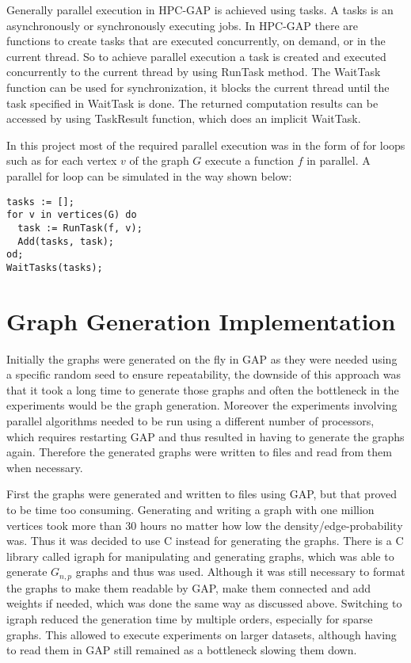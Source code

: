 \documentclass{report}
\theoremstyle{plain}
\theoremstyle{definition}
\theoremstyle{remark}
\begin{document}
Generally parallel execution in HPC-GAP is achieved using tasks. A tasks is an asynchronously or synchronously executing jobs. In HPC-GAP there are functions to create tasks that are executed concurrently, on demand, or in the current thread. So to achieve parallel execution a task is created and executed concurrently to the current thread by using RunTask method. The WaitTask function can be used for synchronization, it blocks the current thread until the task specified in WaitTask is done. The returned computation results can be accessed by using TaskResult function, which does an implicit WaitTask.

In this project most of the required parallel execution was in the form of for loops such as for each vertex $v$ of the graph $G$ execute a function $f$ in parallel. A parallel for loop can be simulated in the way shown below:

\begin{lstlisting}
tasks := [];
for v in vertices(G) do
  task := RunTask(f, v);
  Add(tasks, task);
od;
WaitTasks(tasks);
\end{lstlisting}

\section{Graph Generation Implementation}

Initially the graphs were generated on the fly in GAP as they were needed  using a specific random seed to ensure repeatability, the downside of this approach was that it took a long time to generate those graphs and often the bottleneck in the experiments would be the graph generation. Moreover the experiments involving parallel algorithms needed to be run using a different number of processors, which requires restarting GAP and thus resulted in having to generate the graphs again. Therefore the generated graphs were written to files and read from them when necessary.

First the graphs were generated and written to files using GAP, but that proved to be time too consuming. Generating and writing a graph with one million vertices took more than 30 hours no matter how low the density/edge-probability was. Thus it was decided to use C instead for generating the graphs. There is a C library called igraph for manipulating and generating graphs, which was able to generate $G_{n,p}$ graphs and thus was used. Although it was still necessary to format the graphs to make them readable by GAP, make them connected and add weights if needed, which was done the same way as discussed above. Switching to igraph reduced the generation time by multiple orders, especially for sparse graphs. This allowed to execute experiments on larger datasets, although having to read them in GAP still remained as a bottleneck slowing them down.
\end{document}
